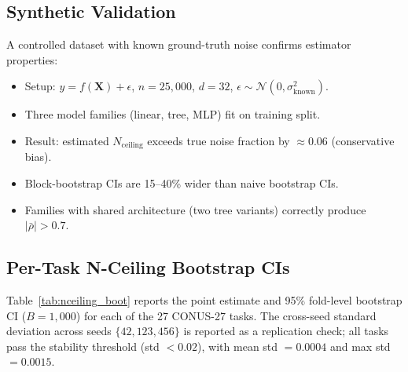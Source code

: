 \documentclass{article}
\begin{document}
\subsection{Synthetic Validation}

A controlled dataset with known ground-truth noise confirms estimator properties:
\begin{itemize}
\item Setup: $y = f(\mathbf{X}) + \epsilon$, $n{=}25{,}000$, $d{=}32$, $\epsilon \sim \mathcal{N}(0, \sigma^2_{\text{known}})$.
\item Three model families (linear, tree, MLP) fit on training split.
\item Result: estimated $N_{\text{ceiling}}$ exceeds true noise fraction by ${\approx}0.06$ (conservative bias).
\item Block-bootstrap CIs are 15--40\% wider than naive bootstrap CIs.
\item Families with shared architecture (two tree variants) correctly produce $|\bar{\rho}| > 0.7$.
\end{itemize}

\subsection{Per-Task N-Ceiling Bootstrap CIs}
\label{app:nceiling_pertask}

Table~\ref{tab:nceiling_boot} reports the point estimate and 95\% fold-level bootstrap CI ($B{=}1{,}000$) for each of the 27 CONUS-27 tasks. The cross-seed standard deviation across seeds $\{42, 123, 456\}$ is reported as a replication check; all tasks pass the stability threshold (std $< 0.02$), with mean std $= 0.0004$ and max std $= 0.0015$.
\end{document}
